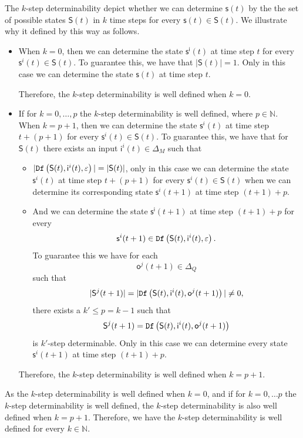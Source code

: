 The $k$-step determinability depict whether we can determine $\mathsf{s}(t)$ by the the set of possible states $\mathsf{S}(t)$ in $k$ time steps for every $\mathsf{s}(t) \in \mathsf{S}(t)$. We illustrate why it defined by this way as follows.
\begin{itemize}
\item When $k=0$, then we can determine the state $\mathsf{s^{i}}(t)$ at time step $t$ for every $\mathsf{s}^{i}(t)\in \mathsf{S}(t)$. To guarantee this, we have that $|\mathsf{S}(t)|=1$. Only in this case we can determine the state $\mathsf{s}(t)$ at time step $t$. 

Therefore, the $k$-step determinability is well defined when $k=0$.

\item  If for $k=0,\ldots, p$ the $k$-step determinability is well defined, where $p\in\mathbb{N}$. When $k=p+1$, then we can determine the state $\mathsf{s}^{i}(t)$ at time step $t+(p+1)$ for every $\mathsf{s}^{i}(t)\in \mathsf{S}(t)$. To guarantee this, we have that for $\mathsf{S}(t)$ there exists an input $\mathsf{i}^{i}(t) \in \Delta_M$ such that
\begin{itemize}
\item $|{\tt Df}\left(\mathsf{S}(t),\mathsf{i}^{i}(t),\varepsilon\right)|=|\mathsf{S}(t)|$, only in this case we can determine the state $\mathsf{s}^{i}(t)$ at time step $t+(p+1)$ for every $\mathsf{s}^{i}(t)\in \mathsf{S}(t)$ when we can determine its corresponding state $\mathsf{s}^{i}(t+1)$ at time step $(t+1)+p$.
\item And we can determine the state $\mathsf{s^{i}}(t+1)$ at time step $(t+1)+p$ for every \[\mathsf{s}^{i}(t+1)\in {\tt Df}\left(\mathsf{S}(t),\mathsf{i}^{i}(t),\varepsilon\right).\] To guarantee this we have for each \[\mathsf{o}^{j}(t+1)\in \Delta_Q\] such that \[|\mathsf{S}^{j}(t+1)|=|{\tt Df}\left(\mathsf{S}(t),\mathsf{i}^{i}(t),\mathsf{o}^{j}(t+1)\right)|\neq 0,\] there exists a ${k'}\le p=k-1$ such that \[\mathsf{S}^{j}(t+1)={\tt Df}\left(\mathsf{S}(t),\mathsf{i}^{i}(t),\mathsf{o}^{j}(t+1)\right)\] is $k'$-step determinable. Only in this case we can determine every state $\mathsf{s}^{i}(t+1)$ at time step $(t+1)+p$.
 \end{itemize}
Therefore, the $k$-step determinability is well defined when $k=p+1$.

 \end{itemize}
 
As the $k$-step determinability is well defined when $k=0$, and if for $k=0,\ldots p$ the $k$-step determinability is well defined, the $k$-step determinability is also well defined when $k=p+1$. Therefore, we have the $k$-step determinability is well defined for every $k\in \mathbb{N}$.
 

